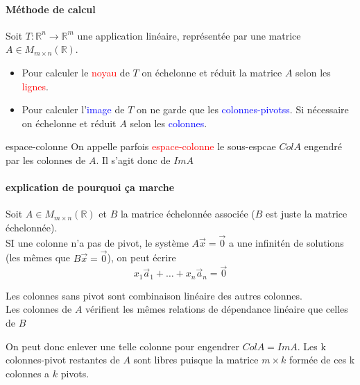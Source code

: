 \paragraph{Méthode de calcul}
Soit $T : \mathbb{R}^n \to \mathbb{R}^m$ une application linéaire, représentée par une matrice $A \in M_{m\times n}(\mathbb{R})$.
\begin{itemize}
    \item Pour calculer le \textcolor{red}{noyau} de $T$ on échelonne et réduit la matrice $A$ selon les \textcolor{red}{lignes}.
    \item Pour calculer l'\textcolor{blue}{image} de $T$ on ne garde que les \textcolor{blue}{colonnes-pivotss}. Si nécessaire on échelonne et réduit $A$ selon les \textcolor{blue}{colonnes}.
\end{itemize}

\begin{framedremark}{espace-colonne}
    On appelle parfois \textcolor{red}{espace-colonne} le sous-espcae $ColA$ engendré par les colonnes de $A$. Il s'agit donc de $Im A$
\end{framedremark}
\paragraph{explication de pourquoi ça marche}
Soit $A \in M_{m\times n}(\mathbb{R})$ et $B$ la matrice échelonnée associée ($B$ est juste la matrice échelonnée).
\\
SI une colonne n'a pas de pivot, le système $A\vec{x} = \vec{0} $ a une infinitén de solutions (les mêmes que $B\vec{x} = \vec{0}$), on peut écrire
\[x_1\vec{a}_1 + \dots + x_n\vec{a}_n = \vec{0}\]


\begin{framedremark}
    Les colonnes sans pivot sont combinaison linéaire des autres colonnes.\\ Les colonnes de $A$ vérifient les mêmes relations de dépendance linéaire que celles de $B$
\end{framedremark}
On peut donc enlever une telle colonne pour engendrer $ColA = ImA$. Les k colonnes-pivot restantes de $A$ sont libres puisque la matrice $m\times k$ formée de ces k colonnes a $k$ pivots.

